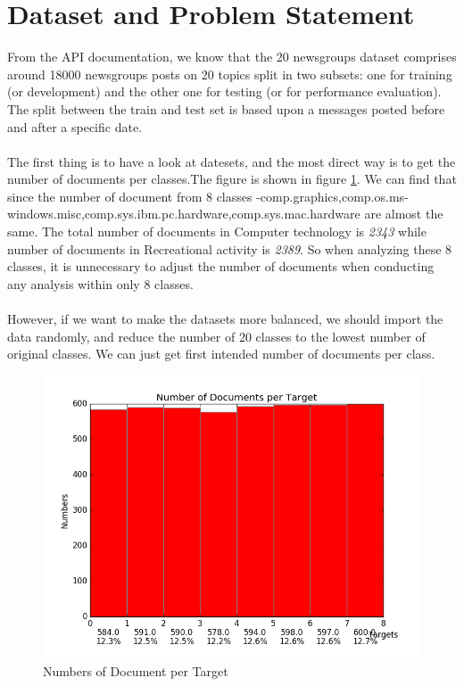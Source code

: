 \documentclass{article}
\begin{document}
\section{Dataset and Problem Statement}
From the API documentation, we know that the 20 newsgroups dataset comprises around 18000 newsgroups posts on 20 topics split in two subsets: one for training (or development) and the other one for testing (or for performance evaluation). The split between the train and test set is based upon a messages posted before and after a specific date. \\
\\
The first thing is to have a look at datesets, and the most direct way is to get the number of documents per classes.The figure is shown in figure \ref{fig:problema}. We can find that since the number of document from 8 classes -comp.graphics,comp.os.ms-windows.misc,comp.sys.ibm.pc.hardware,comp.sys.mac.hardware are almost the same. The total number of documents in Computer technology is \emph{2343} while number of documents in Recreational activity is \emph{2389}. So when analyzing these 8 classes, it is unnecessary to adjust the number of documents when conducting any analysis within only 8 classes. \\
\\
However, if we want to make the datasets more balanced, we should import the data randomly, and reduce the number of 20 classes to the lowest number of original classes. We can just get first intended number of documents per class.
\begin{figure}[htbp]
\centering
\includegraphics[width=.6\textwidth]{problema.png}
\caption{Numbers of Document per Target}
\label{fig:problema}
\end{figure}
\end{document}
